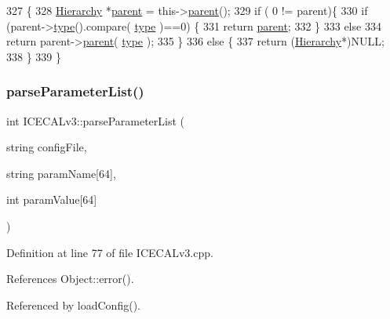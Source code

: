 \begin{DoxyCode}
327                                             \{
328   \hyperlink{classHierarchy}{Hierarchy} *\hyperlink{classHierarchy_a1c7bec8257e717f9c1465e06ebf845fc}{parent} = this->\hyperlink{classHierarchy_a1c7bec8257e717f9c1465e06ebf845fc}{parent}();
329   \textcolor{keywordflow}{if} ( 0 != parent)\{
330     \textcolor{keywordflow}{if} (parent->\hyperlink{classObject_a84f99f70f144a83e1582d1d0f84e4e62}{type}().compare( \hyperlink{classObject_a84f99f70f144a83e1582d1d0f84e4e62}{type} )==0) \{
331       \textcolor{keywordflow}{return} \hyperlink{classHierarchy_a1c7bec8257e717f9c1465e06ebf845fc}{parent};
332     \}
333     \textcolor{keywordflow}{else}
334       \textcolor{keywordflow}{return} parent->\hyperlink{classHierarchy_a1c7bec8257e717f9c1465e06ebf845fc}{parent}( \hyperlink{classObject_a84f99f70f144a83e1582d1d0f84e4e62}{type} );
335   \}
336   \textcolor{keywordflow}{else} \{
337     \textcolor{keywordflow}{return} (\hyperlink{classHierarchy}{Hierarchy}*)NULL;
338   \}
339 \}
\end{DoxyCode}
\mbox{\label{classICECALv3_a313e8166af1ce26b4026f883ad900fb9}} 
\subsubsection{\texorpdfstring{parse\+Parameter\+List()}{parseParameterList()}}
{\footnotesize\ttfamily int I\+C\+E\+C\+A\+Lv3\+::parse\+Parameter\+List (\begin{DoxyParamCaption}\item[{string}]{config\+File,  }\item[{string}]{param\+Name\mbox{[}64\mbox{]},  }\item[{int}]{param\+Value\mbox{[}64\mbox{]} }\end{DoxyParamCaption})\hspace{0.3cm}{\ttfamily [private]}}



Definition at line 77 of file I\+C\+E\+C\+A\+Lv3.\+cpp.



References Object\+::error().



Referenced by load\+Config().


